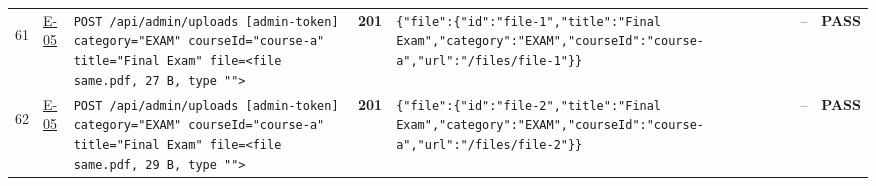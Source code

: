 \documentclass[10pt,a4paper]{article}
\begin{document}
\begin{landscape}
\begin{longtable}{@{}P{0.6cm}P{0.9cm}P{8.5cm}P{1.0cm}P{6.2cm}P{4.2cm}P{1.1cm}@{}}
\hypertarget{call61}{61} & \hyperlink{test-E-05}{E-05} & \texttt{POST /\allowbreak{}api/\allowbreak{}admin/\allowbreak{}uploads [admin-\allowbreak{}token] category=\allowbreak{}"\allowbreak{}EXAM"\allowbreak{} courseId=\allowbreak{}"\allowbreak{}course-\allowbreak{}a"\allowbreak{} title=\allowbreak{}"\allowbreak{}Final Exam"\allowbreak{} file=\allowbreak{}<file same.\allowbreak{}pdf,\allowbreak{} 27 B,\allowbreak{} type "\allowbreak{}"\allowbreak{}>} & \textcolor{passgreen}{\textbf{201}} & \texttt{\{"\allowbreak{}file"\allowbreak{}:\allowbreak{}\{"\allowbreak{}id"\allowbreak{}:\allowbreak{}"\allowbreak{}file-\allowbreak{}1"\allowbreak{},\allowbreak{}"\allowbreak{}title"\allowbreak{}:\allowbreak{}"\allowbreak{}Final Exam"\allowbreak{},\allowbreak{}"\allowbreak{}category"\allowbreak{}:\allowbreak{}"\allowbreak{}EXAM"\allowbreak{},\allowbreak{}"\allowbreak{}courseId"\allowbreak{}:\allowbreak{}"\allowbreak{}course-\allowbreak{}a"\allowbreak{},\allowbreak{}"\allowbreak{}url"\allowbreak{}:\allowbreak{}"\allowbreak{}/\allowbreak{}files/\allowbreak{}file-\allowbreak{}1"\allowbreak{}\}\}} & -- & \textcolor{passgreen}{\textbf{PASS}} \\
\hypertarget{call62}{62} & \hyperlink{test-E-05}{E-05} & \texttt{POST /\allowbreak{}api/\allowbreak{}admin/\allowbreak{}uploads [admin-\allowbreak{}token] category=\allowbreak{}"\allowbreak{}EXAM"\allowbreak{} courseId=\allowbreak{}"\allowbreak{}course-\allowbreak{}a"\allowbreak{} title=\allowbreak{}"\allowbreak{}Final Exam"\allowbreak{} file=\allowbreak{}<file same.\allowbreak{}pdf,\allowbreak{} 29 B,\allowbreak{} type "\allowbreak{}"\allowbreak{}>} & \textcolor{passgreen}{\textbf{201}} & \texttt{\{"\allowbreak{}file"\allowbreak{}:\allowbreak{}\{"\allowbreak{}id"\allowbreak{}:\allowbreak{}"\allowbreak{}file-\allowbreak{}2"\allowbreak{},\allowbreak{}"\allowbreak{}title"\allowbreak{}:\allowbreak{}"\allowbreak{}Final Exam"\allowbreak{},\allowbreak{}"\allowbreak{}category"\allowbreak{}:\allowbreak{}"\allowbreak{}EXAM"\allowbreak{},\allowbreak{}"\allowbreak{}courseId"\allowbreak{}:\allowbreak{}"\allowbreak{}course-\allowbreak{}a"\allowbreak{},\allowbreak{}"\allowbreak{}url"\allowbreak{}:\allowbreak{}"\allowbreak{}/\allowbreak{}files/\allowbreak{}file-\allowbreak{}2"\allowbreak{}\}\}} & -- & \textcolor{passgreen}{\textbf{PASS}} \\

\end{longtable}
\end{landscape}
\end{document}
